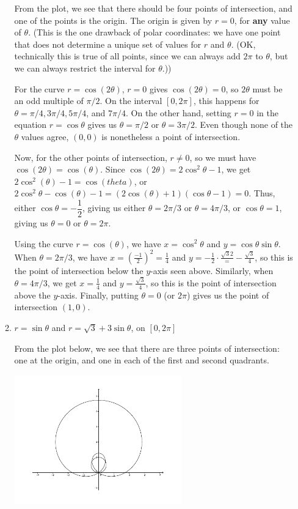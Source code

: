 \documentclass[12pt]{article}
\begin{document}
\begin{enumerate}
\begin{enumerate}
From the plot, we see that there should be four points of intersection, and one of the points is the origin. The origin is given by $r=0$, for \textbf{any} value of $\theta$. (This is the one drawback of polar coordinates: we have one point that does not determine a unique set of values for $r$ and $\theta$. (OK, technically this is true of all points, since we can always add $2\pi$ to $\theta$, but we can always restrict the interval for $\theta$.))

For the curve $r=\cos(2\theta)$, $r=0$ gives $\cos(2\theta)=0$, so $2\theta$ must be an odd multiple of $\pi/2$. On the interval $[0,2\pi]$, this happens for $\theta = \pi/4, 3\pi/4, 5\pi/4$, and $7\pi/4$. On the other hand, setting $r=0$ in the equation $r=\cos\theta$ gives us $\theta = \pi/2$ or $\theta = 3\pi/2$. Even though none of the $\theta$ values agree, $(0,0)$ is nonetheless a point of intersection.

Now, for the other points of intersection, $r\neq 0$, so we must have $\cos(2\theta)=\cos(\theta)$. Since $\cos(2\theta) = 2\cos^2\theta-1$, we get $2\cos^2(\theta)-1=\cos(theta)$, or $2\cos^2\theta-\cos(\theta)-1 = (2\cos(\theta)+1)(\cos\theta-1)=0$. Thus, either $\cos\theta = -\dfrac{1}{2}$, giving us either $\theta = 2\pi/3$ or $\theta = 4\pi/3$, or $\cos\theta = 1$, giving us $\theta=0$ or $\theta = 2\pi$.

Using the curve $r=\cos(\theta)$, we have $x=\cos^2\theta$ and $y=\cos\theta\sin\theta$. When $\theta = 2\pi/3$, we have $x=\left(\frac{-1}{2}\right)^2 = \frac{1}{4}$ and $y = -\frac{1}{2}\cdot \frac{\sqrt{3}{2}} = -\frac{\sqrt{3}}{4}$, so this is the point of intersection below the $y$-axis seen above. Similarly, when $\theta = 4\pi/3$, we get $x=\frac{1}{4}$ and $y = \frac{\sqrt{3}}{4}$, so this is the point of intersection above the $y$-axis. Finally, putting $\theta=0$ (or $2\pi$) gives us the point of intersection $(1,0)$.


 \item $r=\sin\theta$ and $r=\sqrt{3}+3\sin\theta$, on $[0,2\pi]$

From the plot below, we see that there are three points of intersection: one at the origin, and one in each of the first and second quadrants.


\begin{center}
 \includegraphics[width=0.6\textwidth]{WS6-3b}
\end{center}


\end{enumerate}
\end{enumerate}
\end{document}
